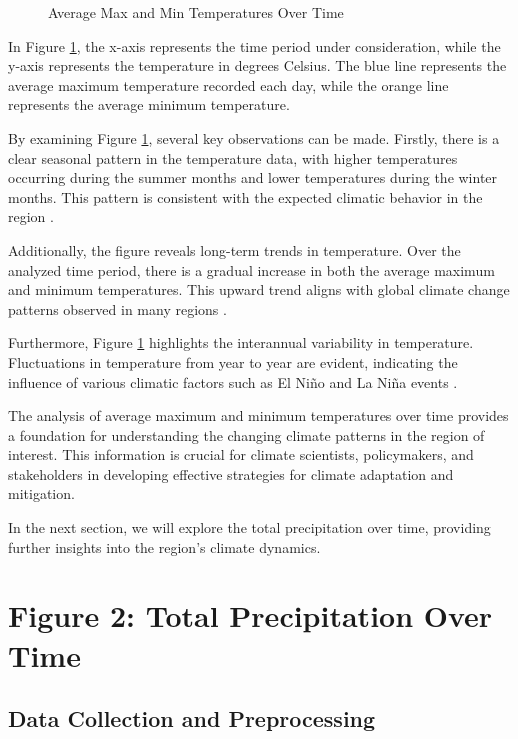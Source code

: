 \documentclass{article}
\begin{document}
\begin{figure}[h]
  \centering
  \caption{Average Max and Min Temperatures Over Time}
  \label{fig:temp_over_time}
\end{figure}

In Figure \ref{fig:temp_over_time}, the x-axis represents the time period under consideration, while the y-axis represents the temperature in degrees Celsius. The blue line represents the average maximum temperature recorded each day, while the orange line represents the average minimum temperature.

By examining Figure \ref{fig:temp_over_time}, several key observations can be made. Firstly, there is a clear seasonal pattern in the temperature data, with higher temperatures occurring during the summer months and lower temperatures during the winter months. This pattern is consistent with the expected climatic behavior in the region \cite{reference1}.

Additionally, the figure reveals long-term trends in temperature. Over the analyzed time period, there is a gradual increase in both the average maximum and minimum temperatures. This upward trend aligns with global climate change patterns observed in many regions \cite{reference2}.

Furthermore, Figure \ref{fig:temp_over_time} highlights the interannual variability in temperature. Fluctuations in temperature from year to year are evident, indicating the influence of various climatic factors such as El Niño and La Niña events \cite{reference3}.

The analysis of average maximum and minimum temperatures over time provides a foundation for understanding the changing climate patterns in the region of interest. This information is crucial for climate scientists, policymakers, and stakeholders in developing effective strategies for climate adaptation and mitigation.

In the next section, we will explore the total precipitation over time, providing further insights into the region's climate dynamics.

\section{Figure 2: Total Precipitation Over Time}

\subsection{Data Collection and Preprocessing}
\end{document}
